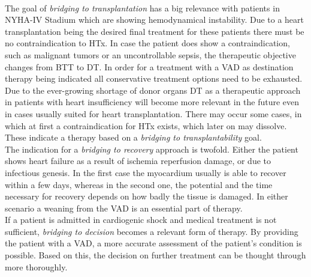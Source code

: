 \\The goal of \textit{bridging to transplantation} has a big relevance with patients in NYHA-IV Stadium which are showing hemodynamical instability. Due to a heart transplantation being the desired final treatment for these patients there must be no contraindication to HTx. In case the patient does show a contraindication, such as malignant tumors or an uncontrollable sepsis, the therapeutic objective changes from BTT to DT. In order for a treatment with a VAD as destination therapy being indicated all conservative treatment options need to be exhausted. Due to the ever-growing shortage of donor organs DT as a therapeutic approach in patients with heart insufficiency will become more relevant in the future even in cases usually suited for heart transplantation. \cite{VAD7} There may occur some cases, in which at first a contraindication for HTx exists, which later on may dissolve. These indicate a therapy based on a \textit{bridging to transplantability} goal. \cite{VAD6}
\\The indication for a \textit{bridging to recovery} approach is twofold. Either the patient shows heart failure as a result of ischemia reperfusion damage, or due to infectious genesis. In the first case the myocardium usually is able to recover within a few days, whereas in the second one, the potential and the time necessary for recovery depends on how badly the tissue is damaged. In either scenario a weaning from the VAD is an essential part of therapy. \cite{VAD7}
\\If a patient is admitted in cardiogenic shock and medical treatment is not sufficient, \textit{bridging to decision} becomes a relevant form of therapy. By providing the patient with a VAD, a more accurate assessment of the patient's condition is possible.
Based on this, the decision on further treatment can be thought through more thoroughly. \cite{VAD6}

